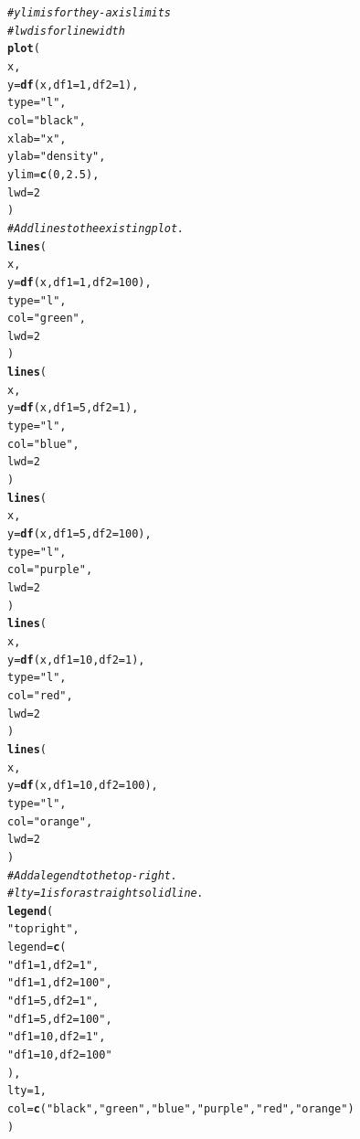 \documentclass[oneside]{book}\usepackage[]{graphicx}\usepackage[dvipsnames,table,xcdraw]{xcolor}
\makeatletter
\newcommand{\hlnum}[1]{\textcolor[rgb]{0.686,0.059,0.569}{#1}}%
\newcommand{\hlstr}[1]{\textcolor[rgb]{0.192,0.494,0.8}{#1}}%
\newcommand{\hlcom}[1]{\textcolor[rgb]{0.678,0.584,0.686}{\textit{#1}}}%
\newcommand{\hlstd}[1]{\textcolor[rgb]{0.345,0.345,0.345}{#1}}%
\newcommand{\hlkwc}[1]{\textcolor[rgb]{0.333,0.667,0.333}{#1}}%
\newcommand{\hlkwd}[1]{\textcolor[rgb]{0.737,0.353,0.396}{\textbf{#1}}}%
\newenvironment{kframe}{%
 \def\at@end@of@kframe{}%
 \ifinner\ifhmode%
  \def\at@end@of@kframe{\end{minipage}}%
  \begin{minipage}{\columnwidth}%
 \fi\fi%
 \def\FrameCommand##1{\hskip\@totalleftmargin \hskip-\fboxsep
 \colorbox{shadecolor}{##1}\hskip-\fboxsep
     \hskip-\linewidth \hskip-\@totalleftmargin \hskip\columnwidth}%
 \MakeFramed {\advance\hsize-\width
   \@totalleftmargin\z@ \linewidth\hsize
   \@setminipage}}%
 {\par\unskip\endMakeFramed%
 \at@end@of@kframe}
\newenvironment{knitrout}{}{} %
\makeatother
\begin{document}
\begin{knitrout}
\begin{kframe}\begin{alltt}
\hlcom{# ylim is for the y-axis limits}
\hlcom{# lwd is for line width}
\hlkwd{plot}\hlstd{(}
\hlstd{x,}
\hlkwc{y} \hlstd{=} \hlkwd{df}\hlstd{(x,} \hlkwc{df1} \hlstd{=} \hlnum{1}\hlstd{,} \hlkwc{df2} \hlstd{=} \hlnum{1}\hlstd{),}
\hlkwc{type} \hlstd{=} \hlstr{"l"}\hlstd{,}
\hlkwc{col} \hlstd{=} \hlstr{"black"}\hlstd{,}
\hlkwc{xlab} \hlstd{=} \hlstr{"x"}\hlstd{,}
\hlkwc{ylab} \hlstd{=} \hlstr{"density"}\hlstd{,}
\hlkwc{ylim} \hlstd{=} \hlkwd{c}\hlstd{(}\hlnum{0}\hlstd{,} \hlnum{2.5}\hlstd{),}
\hlkwc{lwd} \hlstd{=} \hlnum{2}
\hlstd{)}
\hlcom{# Add lines to the existing plot.}
\hlkwd{lines}\hlstd{(}
\hlstd{x,}
\hlkwc{y} \hlstd{=} \hlkwd{df}\hlstd{(x,} \hlkwc{df1} \hlstd{=} \hlnum{1}\hlstd{,} \hlkwc{df2} \hlstd{=} \hlnum{100}\hlstd{),}
\hlkwc{type} \hlstd{=} \hlstr{"l"}\hlstd{,}
\hlkwc{col} \hlstd{=} \hlstr{"green"}\hlstd{,}
\hlkwc{lwd} \hlstd{=} \hlnum{2}
\hlstd{)}
\hlkwd{lines}\hlstd{(}
\hlstd{x,}
\hlkwc{y} \hlstd{=} \hlkwd{df}\hlstd{(x,} \hlkwc{df1} \hlstd{=} \hlnum{5}\hlstd{,} \hlkwc{df2} \hlstd{=} \hlnum{1}\hlstd{),}
\hlkwc{type} \hlstd{=} \hlstr{"l"}\hlstd{,}
\hlkwc{col} \hlstd{=} \hlstr{"blue"}\hlstd{,}
\hlkwc{lwd} \hlstd{=} \hlnum{2}
\hlstd{)}
\hlkwd{lines}\hlstd{(}
\hlstd{x,}
\hlkwc{y} \hlstd{=} \hlkwd{df}\hlstd{(x,} \hlkwc{df1} \hlstd{=} \hlnum{5}\hlstd{,} \hlkwc{df2} \hlstd{=} \hlnum{100}\hlstd{),}
\hlkwc{type} \hlstd{=} \hlstr{"l"}\hlstd{,}
\hlkwc{col} \hlstd{=} \hlstr{"purple"}\hlstd{,}
\hlkwc{lwd} \hlstd{=} \hlnum{2}
\hlstd{)}
\hlkwd{lines}\hlstd{(}
\hlstd{x,}
\hlkwc{y} \hlstd{=} \hlkwd{df}\hlstd{(x,} \hlkwc{df1} \hlstd{=} \hlnum{10}\hlstd{,} \hlkwc{df2} \hlstd{=} \hlnum{1}\hlstd{),}
\hlkwc{type} \hlstd{=} \hlstr{"l"}\hlstd{,}
\hlkwc{col} \hlstd{=} \hlstr{"red"}\hlstd{,}
\hlkwc{lwd} \hlstd{=} \hlnum{2}
\hlstd{)}
\hlkwd{lines}\hlstd{(}
\hlstd{x,}
\hlkwc{y} \hlstd{=} \hlkwd{df}\hlstd{(x,} \hlkwc{df1} \hlstd{=} \hlnum{10}\hlstd{,} \hlkwc{df2} \hlstd{=} \hlnum{100}\hlstd{),}
\hlkwc{type} \hlstd{=} \hlstr{"l"}\hlstd{,}
\hlkwc{col} \hlstd{=} \hlstr{"orange"}\hlstd{,}
\hlkwc{lwd} \hlstd{=} \hlnum{2}
\hlstd{)}
\hlcom{# Add a legend to the top-right.}
\hlcom{# lty = 1 is for a straight solid line.}
\hlkwd{legend}\hlstd{(}
\hlstr{"topright"}\hlstd{,}
\hlkwc{legend} \hlstd{=} \hlkwd{c}\hlstd{(}
\hlstr{"df1=1, df2=1"}\hlstd{,}
\hlstr{"df1=1, df2=100"}\hlstd{,}
\hlstr{"df1=5, df2=1"}\hlstd{,}
\hlstr{"df1=5, df2=100"}\hlstd{,}
\hlstr{"df1=10, df2=1"}\hlstd{,}
\hlstr{"df1=10, df2=100"}
\hlstd{),}
\hlkwc{lty} \hlstd{=} \hlnum{1}\hlstd{,}
\hlkwc{col} \hlstd{=} \hlkwd{c}\hlstd{(}\hlstr{"black"}\hlstd{,} \hlstr{"green"}\hlstd{,} \hlstr{"blue"}\hlstd{,} \hlstr{"purple"}\hlstd{,} \hlstr{"red"}\hlstd{,} \hlstr{"orange"}\hlstd{)}
\hlstd{)}
\end{alltt}
\end{kframe}


\end{knitrout}
\end{document}
